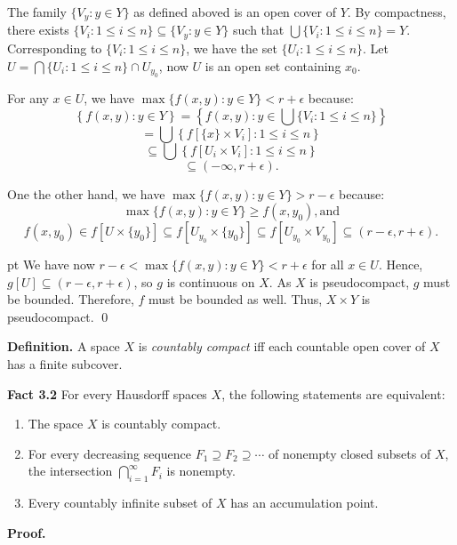 \documentclass{article}
\begin{document}
			  \vskip 12pt

			  The family $\{V_y: y\in Y\}$ as defined aboved is an open cover of $Y$. By compactness, there exists $\{V_i: 1\leq i \leq n\} \subseteq \{V_y: y\in Y\}$ such that $\bigcup \{V_i: 1\leq i \leq n\} = Y$. Corresponding to $\{V_i: 1\leq i \leq n\}$, we have the set $\{U_i: 1\leq i \leq n\}$. Let $U=\bigcap \{U_i: 1\leq i \leq n\} \cap U_{y_0}$, now $U$ is an open set containing $x_0$. \\

			  \vskip 5pt

			  For any $x\in U$, we have $\max\{f(x,y):y\in Y\}<r+\epsilon$ because:
			  $$\left\{f(x,y):y\in Y\right\} = \left\{f(x,y):y\in \bigcup \{V_i: 1\leq i \leq n\}\right\}$$
			  $$=\bigcup \left\{f\left[\{x\}\times V_i\right]: 1\leq i\leq n\right\}$$
			  $$\subseteq \bigcup \left\{f\left[U_i\times V_i\right]: 1\leq i\leq n\right\}$$
			  $$ \subseteq (-\infty, r+\epsilon).$$

			  \vskip 20pt

			  One the other hand, we have $\max\{f(x,y):y\in Y\}>r-\epsilon$ because:
			  $$\max\{f(x,y):y\in Y\}\geq f(x,y_0), \mbox{and}$$
			  $$f(x,y_0)\in f\left[U\times \{y_0\}\right] \subseteq f\left[U_{y_0} \times \{y_0\}\right]
			  \subseteq f\left[U_{y_0} \times V_{y_0}\right] \subseteq (r-\epsilon, r+\epsilon).$$


			   pt
			  We have now $r-\epsilon<\max\{f(x,y):y\in Y\}<r+\epsilon$ for all $x\in U$. Hence, $g[U] \subseteq (r-\epsilon, r+\epsilon)$, so $g$ is continuous on $X$. 
			  As $X$ is pseudocompact, $g$ must be bounded. Therefore, $f$ must be bounded as well. 
			  Thus, $X\times Y$ is pseudocompact. \qed


			  \vskip 40pt 





			  \textbf{Definition. } A space $X$ is \emph{countably compact} iff each countable open cover of $X$ has a finite subcover.


			  \vskip 30pt

			  \textbf{Fact 3.2} For every Hausdorff spaces $X$, the following statements are equivalent: \vskip 5pt
			  \begin{enumerate}
			  \item  The space $X$ is countably compact.
			  \item For every decreasing sequence $F_1\supseteq F_2 \supseteq \cdots $ of nonempty closed subsets of $X$, the intersection $\bigcap_{i=1}^{\infty} F_i$ is nonempty. 
			  \item Every countably infinite subset of $X$ has an accumulation point. 
			  \end{enumerate}
			  \vskip 15pt
			  \textbf{Proof.} \vskip 10pt
\end{document}
